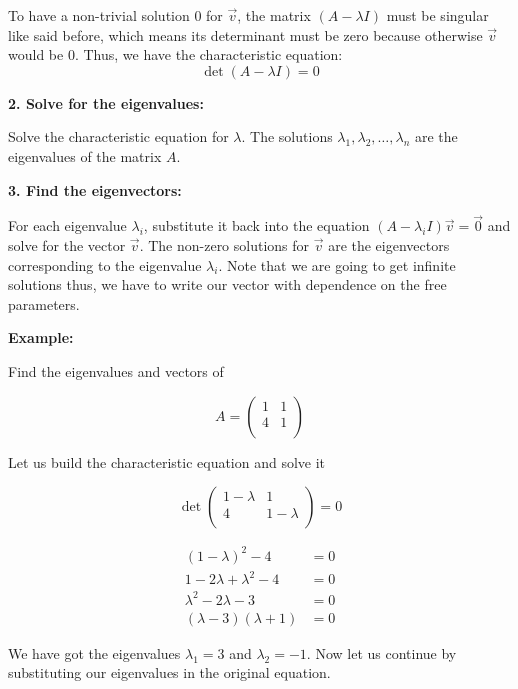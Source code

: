    To have a non-trivial solution \(0\) for \(\vec{v}\), the matrix \((A - \lambda I)\) must be 
    singular like said before, which means its determinant must be zero because otherwise \(\vec{v}\) would be 0. Thus, 
    we have the characteristic equation:
    \[
    \det(A - \lambda I) = 0
    \]

\textbf{2. Solve for the eigenvalues:}

Solve the characteristic equation for \(\lambda\). The solutions \(\lambda_1, \lambda_2, \dots, \lambda_n\) 
are the eigenvalues of the matrix \(A\).
\vspace{\baselineskip}

\textbf{3. Find the eigenvectors:}

For each eigenvalue \(\lambda_i\), substitute it back into the equation \((A - \lambda_i I)\vec{v} = \vec{0}\) and solve 
for the vector \(\vec{v}\). The non-zero solutions for \(\vec{v}\) are the eigenvectors corresponding to the 
eigenvalue \(\lambda_i\). Note that we are going to get infinite solutions thus, we have to write our vector with dependence on the free 
parameters.
\vspace{\baselineskip}

\textbf{Example:}
\vspace{\baselineskip}

Find the eigenvalues and vectors of 

\[
A = \begin{pmatrix}
    1 & 1 \\
    4 & 1 \\
\end{pmatrix}
\]

Let us build the characteristic equation and solve it

\[
\det 
\begin{pmatrix}
    1 - \lambda & 1 \\
    4 & 1 - \lambda \\
\end{pmatrix}
= 0
\]

\begin{align*}
(1 - \lambda)^2 - 4 &= 0 \\
1 - 2\lambda + \lambda^2 - 4 &= 0 \\
\lambda^2 - 2\lambda - 3 &= 0 \\
(\lambda - 3) (\lambda + 1) &= 0 
\end{align*}

We have got the eigenvalues \(\lambda_1 = 3\) and \(\lambda_2 = -1\). Now let us continue by 
substituting our eigenvalues in the original equation.

